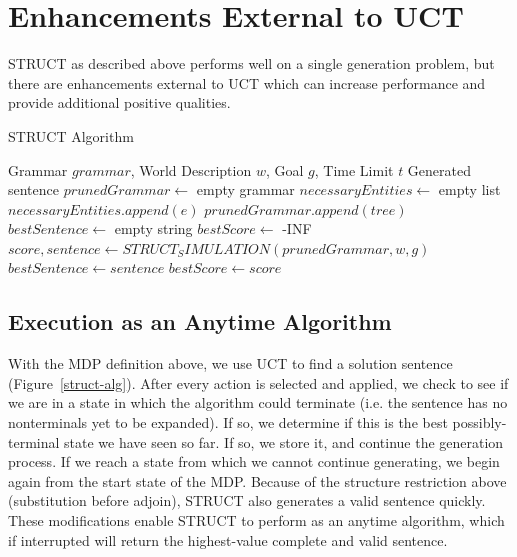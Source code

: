 \section{Enhancements External to UCT}

STRUCT as described above performs well on a single generation problem,
but there are enhancements
external to UCT which can increase performance and provide additional
positive qualities.

\begin{algorithm}
\caption{STRUCT Algorithm} \label{struct-alg}
\begin{algorithmic}[1]
\REQUIRE Grammar $grammar$, World Description $w$, Goal $g$, Time Limit $t$
\ENSURE Generated sentence
\STATE $prunedGrammar \gets$ empty grammar
\STATE $necessaryEntities \gets$ empty list
		\STATE $necessaryEntities.append(e)$
	\ENDIF
\ENDFOR
{}
		\STATE $prunedGrammar.append(tree)$
	\ENDIF
\ENDFOR
\STATE $bestSentence \gets$ empty string
\STATE $bestScore \gets$ -INF
	\STATE $score, sentence \gets STRUCT_SIMULATION(prunedGrammar, w, g)$
		\STATE $bestSentence \gets sentence$
		\STATE $bestScore \gets score$
	\ENDIF
\ENDWHILE
\end{algorithmic}
\end{algorithm}

\subsection{Execution as an Anytime Algorithm}
 With the MDP definition above, we use UCT to find a solution sentence
 (Figure~\ref{struct-alg}). After every action is
 selected and applied, we check to see if we are in a state in which
 the algorithm could terminate (i.e. the sentence has no nonterminals
 yet to be expanded).  If so, we determine if this is the best
 possibly-terminal state we have seen so far.  If so, we store it, and
 continue the generation process. If we reach a state from which we
 cannot continue generating, we begin again from the start state of
 the MDP. Because of the structure restriction above (substitution
 before adjoin), STRUCT also generates a valid sentence quickly. These
 modifications enable STRUCT to perform as an anytime algorithm, which
 if interrupted will return the highest-value complete and valid
 sentence.

